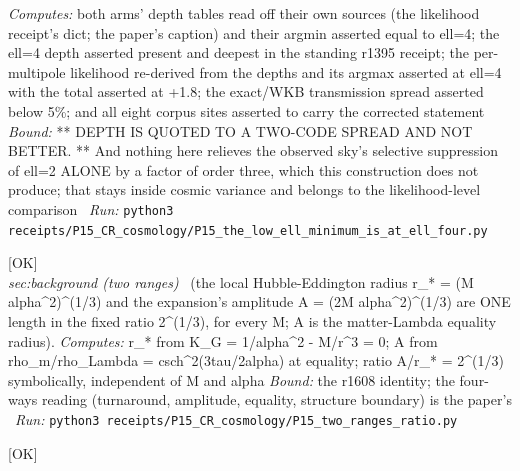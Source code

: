 \begin{description}
\emph{Computes:} both arms' depth tables read off their own sources (the likelihood receipt's dict; the paper's caption) and their argmin asserted equal to ell=4; the ell=4 depth asserted present and deepest in the standing r1395 receipt; the per-multipole likelihood re-derived from the depths and its argmax asserted at ell=4 with the total asserted at +1.8; the exact/WKB transmission spread asserted below 5\%; and all eight corpus sites asserted to carry the corrected statement
 \emph{Bound:} ** DEPTH IS QUOTED TO A TWO-CODE SPREAD AND NOT BETTER. ** And nothing here relieves the observed sky's selective suppression of ell=2 ALONE by a factor of order three, which this construction does not produce; that stays inside cosmic variance and belongs to the likelihood-level comparison
\ \emph{Run:} \texttt{python3 receipts/P15\_CR\_cosmology/P15\_the\_low\_ell\_minimum\_is\_at\_ell\_four.py}
\item[\rcptlabel{P15_two_ranges_ratio}{P15R35}\textbf{P15R35}\quad\texttt{P15\_two\_ranges\_ratio}]\hfill\textsf{[OK]}\\
\textit{sec:background (two ranges)} \ (the local Hubble-Eddington radius r\_* = (M alpha\textasciicircum{}2)\textasciicircum{}(1/3) and the expansion's amplitude A = (2M alpha\textasciicircum{}2)\textasciicircum{}(1/3) are ONE length in the fixed ratio 2\textasciicircum{}(1/3), for every M; A is the matter-Lambda equality radius). 
\emph{Computes:} r\_* from K\_G = 1/alpha\textasciicircum{}2 - M/r\textasciicircum{}3 = 0; A from rho\_m/rho\_Lambda = csch\textasciicircum{}2(3tau/2alpha) at equality; ratio A/r\_* = 2\textasciicircum{}(1/3) symbolically, independent of M and alpha
 \emph{Bound:} the r1608 identity; the four-ways reading (turnaround, amplitude, equality, structure boundary) is the paper's
\ \emph{Run:} \texttt{python3 receipts/P15\_CR\_cosmology/P15\_two\_ranges\_ratio.py}
\item[\rcptlabel{P15_the_second_arm_actually_run}{P15R36}\textbf{P15R36}\quad\texttt{P15\_the\_second\_arm\_actually\_run}]\hfill\textsf{[OK]}\\

\end{description}

